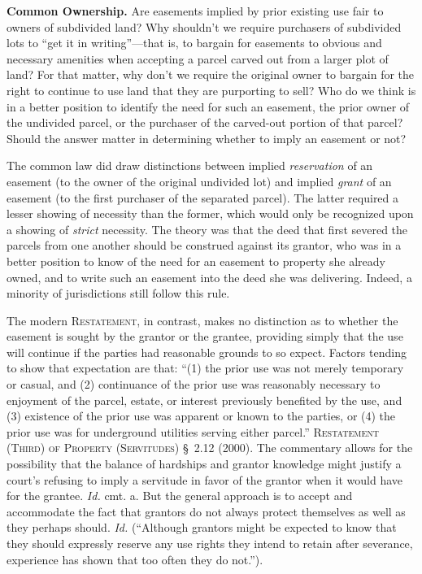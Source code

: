 
\item \textbf{Common Ownership.} Are easements implied by prior existing use
fair to owners of subdivided land? Why shouldn't we require purchasers of
subdivided lots to ``get it in writing''---that is, to bargain for easements to
obvious and necessary amenities when accepting a parcel carved out from a larger
plot of land? For that matter, why don't we require the original owner to
bargain for the right to continue to use land that they are purporting to sell?
Who do we think is in a better position to identify the need for such an
easement, the prior owner of the undivided parcel, or the purchaser of the
carved-out portion of that parcel? Should the answer matter in determining
whether to imply an easement or not?

The common law did draw distinctions between implied \textit{reservation} of an
easement (to the owner of the original undivided lot) and implied \textit{grant}
of an easement (to the first purchaser of the separated parcel). The latter
required a lesser showing of necessity than the former, which would only be
recognized upon a showing of \textit{strict} necessity. The theory was that the
deed that first severed the parcels from one another should be construed against
its grantor, who was in a better position to know of the need for an easement to
property she already owned, and to write such an easement into the deed she was
delivering. Indeed, a minority of jurisdictions still follow this rule.

The modern \textsc{Restatement}, in contrast, makes no distinction as to whether
the
easement is sought by the grantor or the grantee, providing simply that the use
will continue if the parties had reasonable grounds to so expect. Factors
tending to show that expectation are that: ``(1) the prior use was not merely
temporary or casual, and (2) continuance of the prior use was reasonably
necessary to enjoyment of the parcel, estate, or interest previously benefited
by the use, and (3) existence of the prior use was apparent or known to the
parties, or (4) the prior use was for underground utilities serving either
parcel.'' \textsc{Restatement (Third) of Property (Servitudes)} \S~2.12 (2000).
The commentary allows for the possibility that the balance of hardships and
grantor knowledge might justify a court's refusing to imply a servitude in favor
of the grantor when it would have for the grantee. \textit{Id.} cmt. a. But the
general approach is to accept and accommodate the fact that grantors do not
always protect themselves as well as they perhaps should. \textit{Id.}
(``Although grantors might be expected to know that they should expressly
reserve any use rights they intend to retain after severance, experience has
shown that too often they do not.''). 

